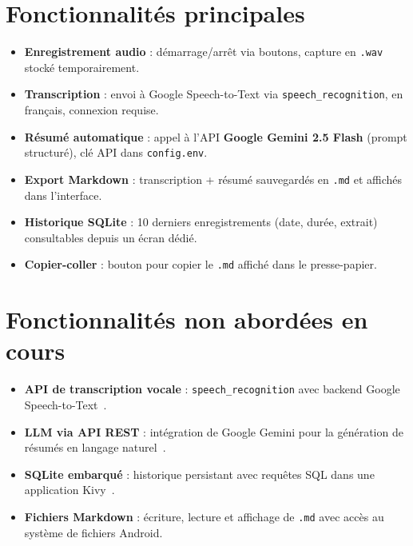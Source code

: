 \documentclass[a4paper,10pt]{article}
\begin{document}
\section{Fonctionnalités principales}

\begin{itemize}
  \item \textbf{Enregistrement audio} : démarrage/arrêt via boutons, capture en \texttt{.wav} stocké temporairement.
  \item \textbf{Transcription} : envoi à Google Speech-to-Text via \texttt{speech\_recognition}, en français, connexion requise.
  \item \textbf{Résumé automatique} : appel à l'API \textbf{Google Gemini 2.5 Flash} (prompt structuré), clé API dans \texttt{config.env}.
  \item \textbf{Export Markdown} : transcription + résumé sauvegardés en \texttt{.md} et affichés dans l'interface.
  \item \textbf{Historique SQLite} : 10 derniers enregistrements (date, durée, extrait) consultables depuis un écran dédié.
  \item \textbf{Copier-coller} : bouton pour copier le \texttt{.md} affiché dans le presse-papier.
\end{itemize}

\section{Fonctionnalités non abordées en cours}

\begin{itemize}
  \item \textbf{API de transcription vocale} : \texttt{speech\_recognition} avec backend Google Speech-to-Text~\cite{speechrecognition}.
  \item \textbf{LLM via API REST} : intégration de Google Gemini pour la génération de résumés en langage naturel~\cite{geminiapi}.
  \item \textbf{SQLite embarqué} : historique persistant avec requêtes SQL dans une application Kivy~\cite{sqlite}.
  \item \textbf{Fichiers Markdown} : écriture, lecture et affichage de \texttt{.md} avec accès au système de fichiers Android.
\end{itemize}
\end{document}

